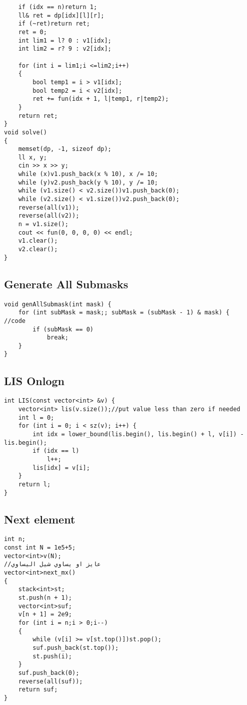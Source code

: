 \documentclass{article}
\begin{document}
{\begin{verbatim}
	if (idx == n)return 1;
	ll& ret = dp[idx][l][r];
	if (~ret)return ret;
	ret = 0;
	int lim1 = l? 0 : v1[idx];
	int lim2 = r? 9 : v2[idx];

	for (int i = lim1;i <=lim2;i++)
	{
		bool temp1 = i > v1[idx];
		bool temp2 = i < v2[idx];
	    ret += fun(idx + 1, l|temp1, r|temp2);
	}
	return ret;
}
void solve()
{
	memset(dp, -1, sizeof dp);
	ll x, y;
	cin >> x >> y;
	while (x)v1.push_back(x % 10), x /= 10;
	while (y)v2.push_back(y % 10), y /= 10;
	while (v1.size() < v2.size())v1.push_back(0);
	while (v2.size() < v1.size())v2.push_back(0);
	reverse(all(v1));
	reverse(all(v2));
	n = v1.size();
	cout << fun(0, 0, 0, 0) << endl;
	v1.clear();
	v2.clear();
}
\end{verbatim}

\subsection{Generate All Submasks}
\begin{verbatim}
void genAllSubmask(int mask) {  
    for (int subMask = mask;; subMask = (subMask - 1) & mask) {  
//code  
        if (subMask == 0)  
            break;  
    }  
}
\end{verbatim}

\subsection{LIS Onlogn}
\begin{verbatim}
int LIS(const vector<int> &v) {  
    vector<int> lis(v.size());//put value less than zero if needed  
    int l = 0;  
    for (int i = 0; i < sz(v); i++) {  
        int idx = lower_bound(lis.begin(), lis.begin() + l, v[i]) - lis.begin();  
        if (idx == l)  
            l++;  
        lis[idx] = v[i];  
    }  
    return l;  
}
\end{verbatim}

\subsection{Next element}
\begin{verbatim}
int n;
const int N = 1e5+5;
vector<int>v(N);
//عايز او يساوي شيل اليساوي 
vector<int>next_mx()
{
	stack<int>st;
	st.push(n + 1);
	vector<int>suf;
	v[n + 1] = 2e9;
	for (int i = n;i > 0;i--)
	{
		while (v[i] >= v[st.top()])st.pop();
		suf.push_back(st.top());
		st.push(i);
	}
	suf.push_back(0);
	reverse(all(suf));
	return suf;
}


\end{verbatim}}
\end{document}

